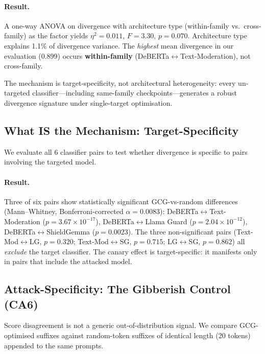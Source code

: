 \documentclass{article}
\begin{document}
\paragraph{Result.} A one-way ANOVA on divergence with architecture type (within-family vs.\ cross-family) as the factor yields $\eta^2 = 0.011$, $F = 3.30$, $p = 0.070$. Architecture type explains 1.1\% of divergence variance. The \emph{highest} mean divergence in our evaluation (0.899) occurs \textbf{within-family} (DeBERTa$\leftrightarrow$Text-Moderation), not cross-family.

The mechanism is target-specificity, not architectural heterogeneity: every un-targeted classifier---including same-family checkpoints---generates a robust divergence signature under single-target optimisation.

\subsection{What IS the Mechanism: Target-Specificity}
\label{sec:target-specificity}

We evaluate all 6 classifier pairs to test whether divergence is specific to pairs involving the targeted model.

\paragraph{Result.} Three of six pairs show statistically significant GCG-vs-random differences (Mann--Whitney, Bonferroni-corrected $\alpha = 0.0083$): DeBERTa$\leftrightarrow$Text-Moderation ($p = 3.67 \times 10^{-17}$), DeBERTa$\leftrightarrow$Llama Guard ($p = 2.04 \times 10^{-12}$), DeBERTa$\leftrightarrow$ShieldGemma ($p = 0.0023$). The three non-significant pairs (Text-Mod$\leftrightarrow$LG, $p = 0.320$; Text-Mod$\leftrightarrow$SG, $p = 0.715$; LG$\leftrightarrow$SG, $p = 0.862$) all \emph{exclude} the target classifier. The canary effect is target-specific: it manifests only in pairs that include the attacked model.

\subsection{Attack-Specificity: The Gibberish Control (CA6)}
\label{sec:ca6}

Score disagreement is not a generic out-of-distribution signal. We compare GCG-optimised suffixes against random-token suffixes of identical length (20 tokens) appended to the same prompts.
\end{document}
